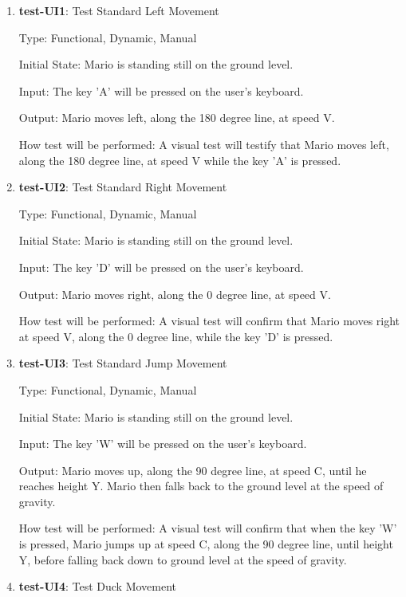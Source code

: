 \documentclass[12pt, titlepage]{article}
\begin{document}
\begin{enumerate}

\item{\textbf{test-UI1}: Test Standard Left Movement\\}

Type: Functional, Dynamic, Manual

Initial State: Mario is standing still on the ground level.

Input: The key 'A' will be pressed on the user's keyboard.

Output: Mario moves left, along the 180 degree line, at speed V.

How test will be performed: A visual test will testify that Mario moves left, along the 180 degree line, at speed V while the key 'A' is pressed.

\item{\textbf{test-UI2}: Test Standard Right Movement\\}

Type: Functional, Dynamic, Manual

Initial State: Mario is standing still on the ground level.

Input: The key 'D' will be pressed on the user's keyboard.

Output: Mario moves right, along the 0 degree line, at speed V.

How test will be performed: A visual test will confirm that Mario moves right at speed V, along the 0 degree line, while the key 'D' is pressed.

\item{\textbf{test-UI3}: Test Standard Jump Movement\\}

Type: Functional, Dynamic, Manual

Initial State: Mario is standing still on the ground level.

Input: The key 'W' will be pressed on the user's keyboard.

Output: Mario moves up, along the 90 degree line, at speed C, until he reaches height Y. Mario then falls back to the ground level at the speed of gravity.

How test will be performed: A visual test will confirm that when the key 'W' is pressed, Mario jumps up at speed C, along the 90 degree line, until height Y, before falling back down to ground level at the speed of gravity.

\item{\textbf{test-UI4}: Test Duck Movement\\}


\end{enumerate}
\end{document}
